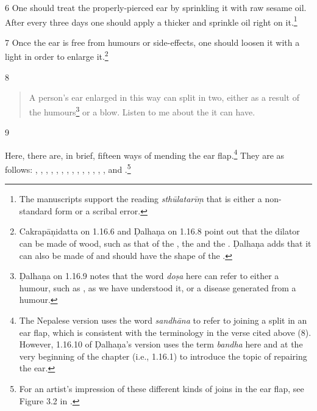 \begin{translation}
    \item[6] One should treat the properly-pierced ear by sprinkling it with raw sesame
    oil.   After every three days one should apply a thicker  and
    sprinkle oil right on it.\footnote{The manuscripts support the reading
    \emph{sthūlatarīṃ} that is either a non-standard form or a scribal error.}
    
    \item[7]
    Once the ear is free from humours or side-effects, one should 
    loosen it with a light  in order to enlarge it.\footnote{Cakrapāṇidatta on 1.16.6 \citep[127]{acar-1939} and Ḍalhaṇa on 1.16.8 \citep[77]{vulgate} point out that the dilator can be made of wood, such as that of the , the  and the . Ḍalhaṇa adds that it can also be made of  and should have the shape of the .}
    
    \item[8]
    
    \begin{verse}

A person's ear enlarged in this way can split in two, either as a result of the humours\footnote{Ḍalhaṇa on 1.16.9  \citep[77]{vulgate} notes that the word \emph{doṣa} here can refer to either a humour, such as , as we have understood it, or a disease generated from a humour.} or a blow. Listen to me about the  it can have.
        
    \end{verse}
    
        \item[9]
    
Here, there are, in brief, fifteen ways of mending the ear flap.\footnote{The Nepalese version uses the word \emph{sandhāna} to refer to joining a split in an ear flap, which is consistent with the terminology in the verse cited above (8). However, 1.16.10 of Ḍalhaṇa's version \citep[77]{vulgate} uses the term \emph{bandha} here and at the very beginning of the chapter (i.e., 1.16.1) to introduce the topic of repairing the ear.}  They are as follows:
    , , , , , , , , , , 
    , ,
    , , and .\footnote{For an artist's impression of these different kinds of joins in the ear flap, see Figure 3.2 in \cite[154]{wuja-2003}.}
    

\end{translation}
